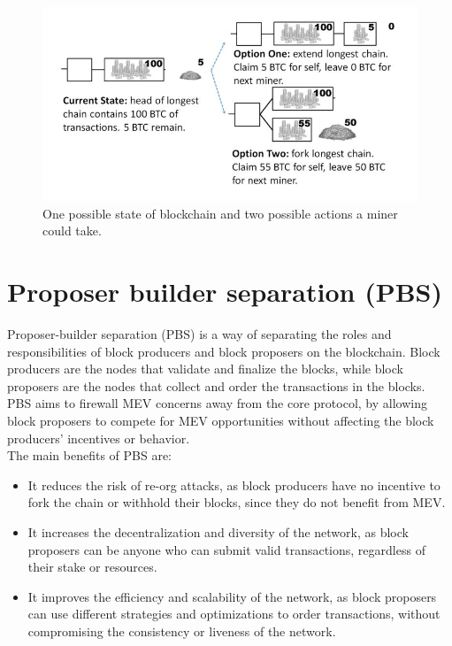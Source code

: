 \documentclass{report}
\begin{document}
 \begin{center}
 	\begin{figure}
 		\centering
 		\includegraphics[width=0.8\linewidth]{Fig/F2}
 		\caption{One possible state of blockchain and two possible actions a miner could take.}
 		\label{fig:f2}
 	\end{figure}
 \end{center}
 \section{Proposer builder separation (PBS)}
 Proposer-builder separation (PBS) is a way of separating the roles and responsibilities of block producers and block proposers on the blockchain. Block producers are the nodes that validate and finalize the blocks, while block proposers are the nodes that collect and order the transactions in the blocks. PBS aims to firewall MEV concerns away from the core protocol, by allowing block proposers to compete for MEV opportunities without affecting the block producers’ incentives or behavior.\\
 The main benefits of PBS are:
 \begin{itemize}
 	\item It reduces the risk of re-org attacks, as block producers have no incentive to fork the chain or withhold their blocks, since they do not benefit from MEV.
 	\item It increases the decentralization and diversity of the network, as block proposers can be anyone who can submit valid transactions, regardless of their stake or resources.
 	\item It improves the efficiency and scalability of the network, as block proposers can use different strategies and optimizations to order transactions, without compromising the consistency or liveness of the network.
 \end{itemize}
\end{document}
